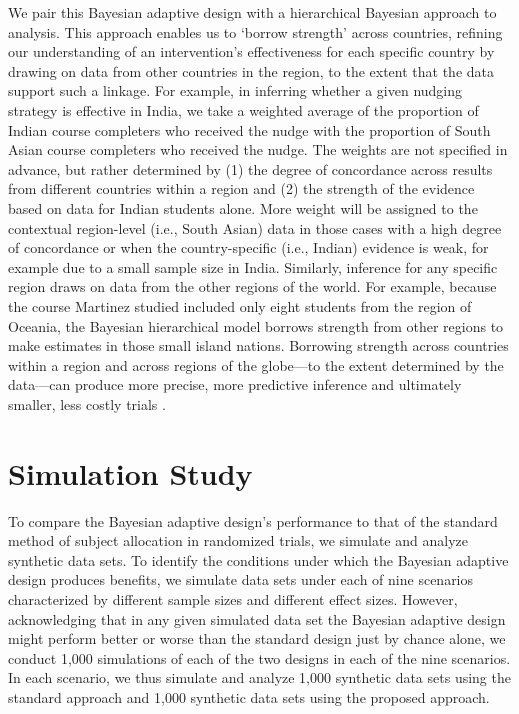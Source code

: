 \documentclass{acm_proc_article-sp}
\begin{document}
We pair this Bayesian adaptive design with a hierarchical Bayesian approach to analysis. This approach enables us to ‘borrow strength' across countries, refining our understanding of an intervention's effectiveness for each specific country by drawing on data from other countries in the region, to the extent that the data support such a linkage. For example, in inferring whether a given nudging strategy is effective in India, we take a weighted average of the proportion of Indian course completers who received the nudge with the proportion of South Asian course completers who received the nudge. The weights are not specified in advance, but rather determined by (1) the degree of concordance across results from different countries within a region and (2) the strength of the evidence based on data for Indian students alone. More weight will be assigned to the contextual region-level (i.e., South Asian) data in those cases with a high degree of concordance or when the country-specific (i.e., Indian) evidence is weak, for example due to a small sample size in India. Similarly, inference for any specific region draws on data from the other regions of the world. For example, because the course Martinez studied included only eight students from the region of Oceania, the Bayesian hierarchical model borrows strength from other regions to make estimates in those small island nations. Borrowing strength across countries within a region and across regions of the globe---to the extent determined by the data---can produce more precise, more predictive inference \cite{gelman2014bayesian} and ultimately smaller, less costly trials \cite{berry2010bayesian}.

\section{Simulation Study}
To compare the Bayesian adaptive design's performance to that of the standard method of subject allocation in randomized trials, we simulate and analyze synthetic data sets. To identify the conditions under which the Bayesian adaptive design produces benefits, we simulate data sets under each of nine scenarios characterized by different sample sizes and different effect sizes. However, acknowledging that in any given simulated data set the Bayesian adaptive design might perform better or worse than the standard design just by chance alone, we conduct 1,000 simulations of each of the two designs in each of the nine scenarios. In each scenario, we thus simulate and analyze 1,000 synthetic data sets using the standard approach and 1,000 synthetic data sets using the proposed approach.
\end{document}
